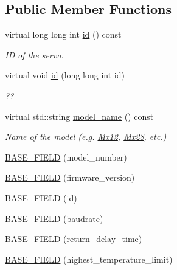 \subsection*{Public Member Functions}
\begin{DoxyCompactItemize}
\item 
virtual long long int \hyperlink{classdynamixel_1_1servos_1_1_base_servo_a191c1596a4fcbe43cc7b9292f83e196b}{id} () const 
\begin{DoxyCompactList}\small\item\em I\+D of the servo. \end{DoxyCompactList}\item 
virtual void \hyperlink{classdynamixel_1_1servos_1_1_base_servo_a20e7410262e37dcd177e81a41d78d8ba}{id} (long long int id)
\begin{DoxyCompactList}\small\item\em ?? \end{DoxyCompactList}\item 
virtual std\+::string \hyperlink{classdynamixel_1_1servos_1_1_base_servo_a0878d6f74b1a26bf23fa53a296fd8283}{model\+\_\+name} () const 
\begin{DoxyCompactList}\small\item\em Name of the model (e.\+g. \hyperlink{classdynamixel_1_1servos_1_1_mx12}{Mx12}, \hyperlink{classdynamixel_1_1servos_1_1_mx28}{Mx28}, etc.) \end{DoxyCompactList}\item 
\hyperlink{classdynamixel_1_1servos_1_1_base_servo_ae136ad4ba45eddc402d3638f42d4cbbd}{B\+A\+S\+E\+\_\+\+F\+I\+E\+L\+D} (model\+\_\+number)
\item 
\hyperlink{classdynamixel_1_1servos_1_1_base_servo_aa700a94b75b928640dbcd887417db861}{B\+A\+S\+E\+\_\+\+F\+I\+E\+L\+D} (firmware\+\_\+version)
\item 
\hyperlink{classdynamixel_1_1servos_1_1_base_servo_af3eded69e54365d754ba7715c9af57ae}{B\+A\+S\+E\+\_\+\+F\+I\+E\+L\+D} (\hyperlink{classdynamixel_1_1servos_1_1_base_servo_a191c1596a4fcbe43cc7b9292f83e196b}{id})
\item 
\hyperlink{classdynamixel_1_1servos_1_1_base_servo_a48bfb690093b070720aa7ca522ab6b1a}{B\+A\+S\+E\+\_\+\+F\+I\+E\+L\+D} (baudrate)
\item 
\hyperlink{classdynamixel_1_1servos_1_1_base_servo_abe54af60eda15894e0be32fe7c447906}{B\+A\+S\+E\+\_\+\+F\+I\+E\+L\+D} (return\+\_\+delay\+\_\+time)
\item 
\hyperlink{classdynamixel_1_1servos_1_1_base_servo_ac3c0ffaea0c5adb2245a875bdd0d9a15}{B\+A\+S\+E\+\_\+\+F\+I\+E\+L\+D} (highest\+\_\+temperature\+\_\+limit)

\end{DoxyCompactItemize}
